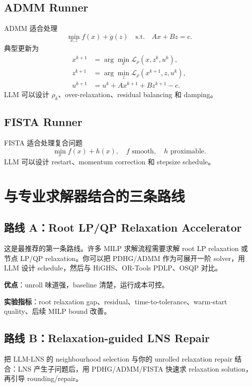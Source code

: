 \documentclass[12pt,a4paper]{ctexart}
\begin{document}
\subsection{ADMM Runner}
ADMM 适合处理
\begin{equation}
    \min_{x,z} f(x)+g(z) \quad \text{s.t.}\quad Ax+Bz=c.
\end{equation}
典型更新为
\begin{align}
    x^{k+1} &= \arg\min_x \mathcal{L}_\rho(x,z^k,u^k),\\
    z^{k+1} &= \arg\min_z \mathcal{L}_\rho(x^{k+1},z,u^k),\\
    u^{k+1} &= u^k + Ax^{k+1}+Bz^{k+1}-c.
\end{align}
LLM 可以设计 $\rho_k$、over-relaxation、residual balancing 和 damping。

\subsection{FISTA Runner}
FISTA 适合处理复合问题
\begin{equation}
    \min_x f(x)+h(x), \quad f \text{ smooth},\quad h \text{ proximable}.
\end{equation}
LLM 可以设计 restart、momentum correction 和 stepsize schedule。

\section{与专业求解器结合的三条路线}

\subsection{路线 A：Root LP/QP Relaxation Accelerator}
这是最推荐的第一条路线。许多 MILP 求解流程需要求解 root LP relaxation 或节点 LP/QP relaxation。你可以把 PDHG/ADMM 作为可展开一阶 solver，用 LLM 设计 schedule，然后与 HiGHS、OR-Tools PDLP、OSQP 对比。

\textbf{优点}：unroll 味道强，baseline 清楚，运行成本可控。

\textbf{实验指标}：root relaxation gap、residual、time-to-tolerance、warm-start quality、后续 MILP bound 改善。

\subsection{路线 B：Relaxation-guided LNS Repair}
把 LLM-LNS 的 neighbourhood selection 与你的 unrolled relaxation repair 结合：LNS 产生子问题后，用 PDHG/ADMM/FISTA 快速求 relaxation solution，再引导 rounding/repair。
\end{document}
